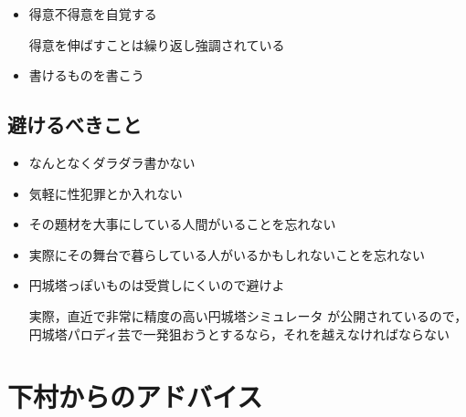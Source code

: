 \documentclass[10pt, a5paper, twoside]{jsarticle}
\theoremstyle{definition}
\begin{document}
			\begin{itemize}
				\item 得意不得意を自覚する\cite{nkm1}

				\vspace{1mm}

				得意を伸ばすことは繰り返し強調されている

				\vspace{2mm}

				\item 書けるものを書こう\cite{nkm1}

			\end{itemize}

		\subsection{避けるべきこと}

			\begin{itemize}
				\item なんとなくダラダラ書かない\cite{nkm2}

				\vspace{2mm}

				\item 気軽に性犯罪とか入れない\cite{nkm2}

				\vspace{2mm}

				\item その題材を大事にしている人間がいることを忘れない\cite{nkm2}

				\vspace{2mm}

				\item 実際にその舞台で暮らしている人がいるかもしれないことを忘れない\cite{nkm2}

				\vspace{2mm}

				\item 円城塔っぽいものは受賞しにくいので避けよ\cite{twi}

				\vspace{1mm}

				実際，直近で非常に精度の高い円城塔シミュレータ\cite{aki} が公開されているので，円城塔パロディ芸で一発狙おうとするなら，それを越えなければならない

			\end{itemize}

	\section{下村からのアドバイス}
\end{document}
